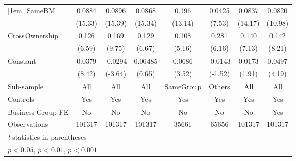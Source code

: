 {\begin{tabular}{l*{7}{c}}
[1em]
SameBM          &   0.0884\sym{***}&   0.0896\sym{***}&   0.0868\sym{***}&    0.196\sym{***}&   0.0425\sym{***}&   0.0837\sym{***}&   0.0820\sym{***}\\
                &  (15.33)         &  (15.39)         &  (15.34)         &  (13.14)         &   (7.53)         &  (14.17)         &  (10.98)         \\
[1em]
CrossOwnership  &    0.126\sym{***}&    0.169\sym{***}&    0.129\sym{***}&    0.108\sym{***}&    0.281\sym{***}&    0.140\sym{***}&    0.142\sym{***}\\
                &   (6.59)         &   (9.75)         &   (6.67)         &   (5.16)         &   (6.16)         &   (7.13)         &   (8.21)         \\
[1em]
Constant        &   0.0379\sym{***}&  -0.0294\sym{***}&  0.00485         &   0.0686\sym{***}&  -0.0143         &   0.0173         &   0.0497\sym{***}\\
                &   (8.42)         &  (-3.64)         &   (0.65)         &   (3.52)         &  (-1.52)         &   (1.91)         &   (4.19)         \\
\hline
Sub-sample      &      All         &      All         &      All         &SameGroup         &   Others         &      All         &      All         \\
Controls        &      Yes         &      Yes         &      Yes         &      Yes         &      Yes         &      Yes         &      Yes         \\
Business Group FE&       No         &       No         &       No         &       No         &       No         &       No         &      Yes         \\
Observations    &   101317         &   101317         &   101317         &    35661         &    65656         &   101317         &   101317         \\
\hline\hline
\multicolumn{8}{l}{\footnotesize \textit{t} statistics in parentheses}\\
\multicolumn{8}{l}{\footnotesize \sym{*} \(p<0.05\), \sym{**} \(p<0.01\), \sym{***} \(p<0.001\)}\\
\end{tabular}
}
